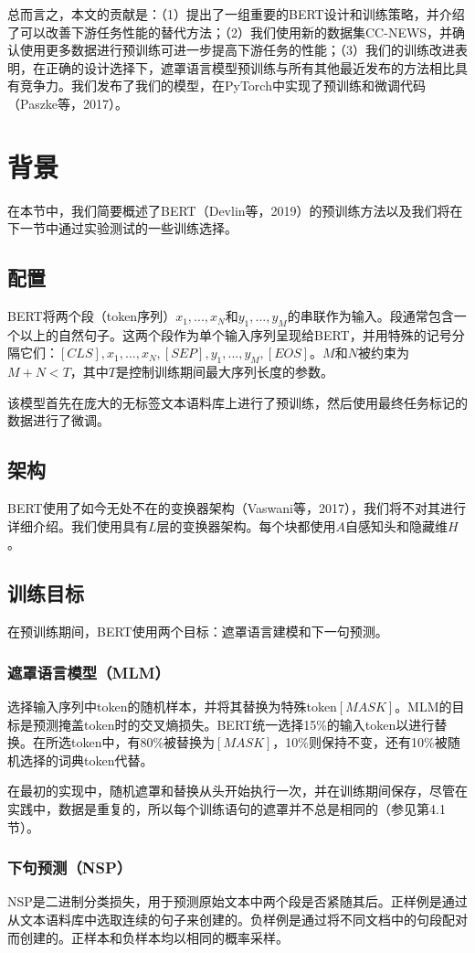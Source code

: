 \documentclass[lang=cn,11pt,a4paper,twocolumn]{elegantpaper}
\begin{document}
总而言之，本文的贡献是：（1）提出了一组重要的BERT设计和训练策略，并介绍了可以改善下游任务性能的替代方法；（2）我们使用新的数据集CC-NEWS，并确认使用更多数据进行预训练可进一步提高下游任务的性能；（3）我们的训练改进表明，在正确的设计选择下，遮罩语言模型预训练与所有其他最近发布的方法相比具有竞争力。我们发布了我们的模型，在PyTorch中实现了预训练和微调代码（Paszke等，2017）。

\section{背景}
在本节中，我们简要概述了BERT（Devlin等，2019）的预训练方法以及我们将在下一节中通过实验测试的一些训练选择。
\subsection{配置}
BERT将两个段（token序列）$x_1,...,x_N$和$y_1,...,y_M$的串联作为输入。段通常包含一个以上的自然句子。这两个段作为单个输入序列呈现给BERT，并用特殊的记号分隔它们：$[CLS],x_1,...,x_N,[SEP],y_1,...,y_M,[EOS]$。$M$和$N$被约束为$M+N<T$，其中$T$是控制训练期间最大序列长度的参数。

该模型首先在庞大的无标签文本语料库上进行了预训练，然后使用最终任务标记的数据进行了微调。

\subsection{架构}
BERT使用了如今无处不在的变换器架构（Vaswani等，2017），我们将不对其进行详细介绍。我们使用具有$L$层的变换器架构。每个块都使用$A$自感知头和隐藏维$H$。

\subsection{训练目标}
在预训练期间，BERT使用两个目标：遮罩语言建模和下一句预测。
\subsubsection{遮罩语言模型（MLM）}
选择输入序列中token的随机样本，并将其替换为特殊token$[MASK]$。MLM的目标是预测掩盖token时的交叉熵损失。BERT统一选择15\%的输入token以进行替换。在所选token中，有80\%被替换为$[MASK]$，10\%则保持不变，还有10\%被随机选择的词典token代替。

在最初的实现中，随机遮罩和替换从头开始执行一次，并在训练期间保存，尽管在实践中，数据是重复的，所以每个训练语句的遮罩并不总是相同的（参见第4.1节）。
\subsubsection{下句预测（NSP）}
NSP是二进制分类损失，用于预测原始文本中两个段是否紧随其后。正样例是通过从文本语料库中选取连续的句子来创建的。负样例是通过将不同文档中的句段配对而创建的。正样本和负样本均以相同的概率采样。
\end{document}
